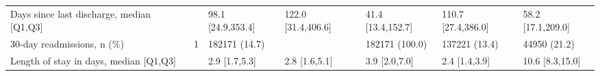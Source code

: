 \begin{tabular}{L{20em}C{10em}C{10em}C{10em}C{10em}C{10em}}
         Days since last discharge, median [Q1,Q3] &                                    \hspace{3mm}  &  98.1 [24.9,353.4] &                      122.0 [31.4,406.6] &                   41.4 [13.4,152.7] &                       110.7 [27.4,386.0] &                   58.2 [17.1,209.0] \\
                        30-day readmissions, n (\%) &                                   \hspace{3mm} 1 &      182171 (14.7) &                                         &                      182171 (100.0) &                            137221 (13.4) &                        44950 (21.2) \\
            Length of stay in days, median [Q1,Q3] &                                    \hspace{3mm}  &      2.9 [1.7,5.3] &                           2.8 [1.6,5.1] &                       3.9 [2.0,7.0] &                            2.4 [1.4,3.9] &                     10.6 [8.3,15.0] \\
\bottomrule
\end{tabular}
